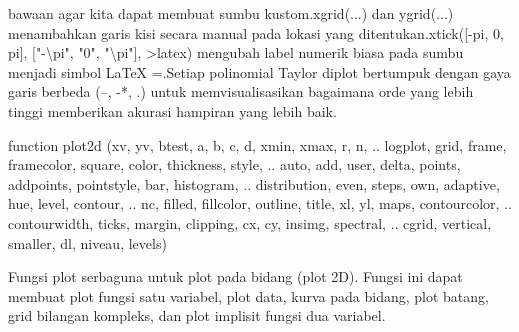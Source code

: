 \documentclass[a4paper,10pt]{article}
\begin{document}
\begin{eulernotebook}
\begin{eulercomment}
\begin{eulercomment}
\begin{eulercomment}
\begin{eulercomment}
\begin{eulercomment}
\begin{eulercomment}
\begin{eulercomment}
bawaan agar kita dapat membuat sumbu kustom.xgrid(...) dan ygrid(...)
menambahkan garis kisi secara manual pada lokasi yang
ditentukan.xtick([-pi, 0, pi], ["-\textbackslash{}pi", "0", "\textbackslash{}pi"], \textgreater{}latex) mengubah
label numerik biasa pada sumbu  menjadi simbol LaTeX =.Setiap
polinomial Taylor diplot bertumpuk dengan gaya garis berbeda (--, -*,
.) untuk memvisualisasikan bagaimana orde yang lebih tinggi memberikan
akurasi hampiran yang lebih baik.
\end{eulercomment}
\begin{eulercomment}
\end{eulercomment}
\begin{eulerttcomment}
  function plot2d (xv, yv, btest, a, b, c, d, xmin, xmax, r, n,  ..
  logplot, grid, frame, framecolor, square, color, thickness, style, ..
  auto, add, user, delta, points, addpoints, pointstyle, bar, histogram,  ..
  distribution, even, steps, own, adaptive, hue, level, contour,  ..
  nc, filled, fillcolor, outline, title, xl, yl, maps, contourcolor, ..
  contourwidth, ticks, margin, clipping, cx, cy, insimg, spectral,  ..
  cgrid, vertical, smaller, dl, niveau, levels)
\end{eulerttcomment}
\begin{eulercomment}
Fungsi plot serbaguna untuk plot pada bidang (plot 2D). Fungsi ini dapat membuat
plot fungsi satu variabel, plot data, kurva pada bidang, plot batang, grid bilangan
kompleks, dan plot implisit fungsi dua variabel.


\end{eulercomment}
\end{eulercomment}
\end{eulercomment}
\end{eulercomment}
\end{eulercomment}
\end{eulercomment}
\end{eulercomment}
\end{eulernotebook}
\end{document}
